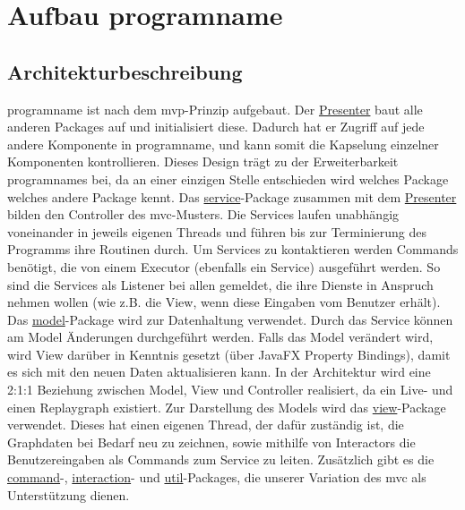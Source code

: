 \chapter{Aufbau \gls{programname}}
\label{ch:aufbau_programname}

\section{Architekturbeschreibung}

\gls{programname} ist nach dem \gls{mvp}-Prinzip aufgebaut. Der
\hyperref[subsec:presenter]{Presenter} baut alle anderen Packages auf und
initialisiert diese. Dadurch hat er Zugriff auf jede andere Komponente in \gls{programname},
und kann somit die Kapselung einzelner Komponenten kontrollieren. Dieses Design
trägt zu der Erweiterbarkeit \gls{programname}s bei, da an einer einzigen
Stelle entschieden wird welches Package welches andere Package kennt.
\newline
\newline
Das \hyperref[subsec:service]{service}-Package zusammen mit dem \hyperref[subsec:presenter]{Presenter}
bilden den Controller des \gls{mvc}-Musters. Die Services laufen unabhängig voneinander in
jeweils eigenen Threads und führen bis zur Terminierung des Programms ihre Routinen durch.
Um Services zu kontaktieren werden Commands benötigt, die von einem Executor (ebenfalls ein
Service) ausgeführt werden. So sind die Services als Listener bei allen gemeldet, die ihre
Dienste in Anspruch nehmen wollen (wie z.B. die View, wenn diese Eingaben vom Benutzer erhält).
\newline
\newline
Das \hyperref[subsec:model]{model}-Package wird zur Datenhaltung verwendet. Durch das Service
können am Model Änderungen durchgeführt werden. Falls das Model verändert wird, wird View
darüber in Kenntnis gesetzt (über JavaFX Property Bindings), damit es sich mit den neuen Daten
aktualisieren kann. In der Architektur wird eine 2:1:1 Beziehung zwischen Model,
View und Controller realisiert, da ein Live- und einen Replaygraph existiert.
\newline
\newline
Zur Darstellung des Models wird das \hyperref[subsec:view]{view}-Package verwendet. Dieses
hat einen eigenen Thread, der dafür zuständig ist, die Graphdaten bei Bedarf neu zu zeichnen,
sowie mithilfe von Interactors die Benutzereingaben als Commands zum Service zu leiten.
\newline
\newline
Zusätzlich gibt es die \hyperref[subsec:command]{command}-, \hyperref[subsec:interaction]{interaction}-
und \hyperref[subsec:util]{util}-Packages, die unserer Variation des \gls{mvc} als Unterstützung dienen.


